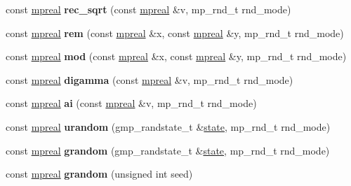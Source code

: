 \begin{DoxyCompactItemize}
const \hyperlink{classmpfr_1_1mpreal}{mpreal} {\bfseries rec\+\_\+sqrt} (const \hyperlink{classmpfr_1_1mpreal}{mpreal} \&v, mp\+\_\+rnd\+\_\+t rnd\+\_\+mode)
\item 
\mbox{\label{classmpfr_1_1mpreal_a2461f52f3253c1e1e808f781f392164b}} 
const \hyperlink{classmpfr_1_1mpreal}{mpreal} {\bfseries rem} (const \hyperlink{classmpfr_1_1mpreal}{mpreal} \&x, const \hyperlink{classmpfr_1_1mpreal}{mpreal} \&y, mp\+\_\+rnd\+\_\+t rnd\+\_\+mode)
\item 
\mbox{\label{classmpfr_1_1mpreal_ac80a910222f72adb09d723f1a21f5a82}} 
const \hyperlink{classmpfr_1_1mpreal}{mpreal} {\bfseries mod} (const \hyperlink{classmpfr_1_1mpreal}{mpreal} \&x, const \hyperlink{classmpfr_1_1mpreal}{mpreal} \&y, mp\+\_\+rnd\+\_\+t rnd\+\_\+mode)
\item 
\mbox{\label{classmpfr_1_1mpreal_ab979e4a020c2fcb4cbd3dab29b3acf90}} 
const \hyperlink{classmpfr_1_1mpreal}{mpreal} {\bfseries digamma} (const \hyperlink{classmpfr_1_1mpreal}{mpreal} \&v, mp\+\_\+rnd\+\_\+t rnd\+\_\+mode)
\item 
\mbox{\label{classmpfr_1_1mpreal_a21d422bbf4e20ec2cbe3e2171255e795}} 
const \hyperlink{classmpfr_1_1mpreal}{mpreal} {\bfseries ai} (const \hyperlink{classmpfr_1_1mpreal}{mpreal} \&v, mp\+\_\+rnd\+\_\+t rnd\+\_\+mode)
\item 
\mbox{\label{classmpfr_1_1mpreal_a3150004a1bdaeb8511acb3a24d63e89c}} 
const \hyperlink{classmpfr_1_1mpreal}{mpreal} {\bfseries urandom} (gmp\+\_\+randstate\+\_\+t \&\hyperlink{structstate}{state}, mp\+\_\+rnd\+\_\+t rnd\+\_\+mode)
\item 
\mbox{\label{classmpfr_1_1mpreal_af3bd5ed3be90dc79fe2f91eb0e12f0d7}} 
const \hyperlink{classmpfr_1_1mpreal}{mpreal} {\bfseries grandom} (gmp\+\_\+randstate\+\_\+t \&\hyperlink{structstate}{state}, mp\+\_\+rnd\+\_\+t rnd\+\_\+mode)
\item 
\mbox{\label{classmpfr_1_1mpreal_a6d53807ca7acdd79c071aae83c628289}} 
const \hyperlink{classmpfr_1_1mpreal}{mpreal} {\bfseries grandom} (unsigned int seed)
\item 
\mbox{\label{classmpfr_1_1mpreal_a77253617c63bff689788ea87fb7bc12f}} 

\end{DoxyCompactItemize}
